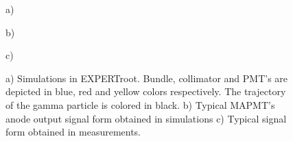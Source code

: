 \documentclass{webofc}
\newcommand{\er}{\textmd{EXPERTroot}}
\begin{document}
	\begin{figure} 
		\begin{minipage}[h]{\linewidth} 
			 a) \\ 
		\end{minipage} 
		\vfill 
		\begin{minipage}[h]{0.47\linewidth} 
			 b) \\
		\end{minipage} 
		\hfill 
		\begin{minipage}[h]{0.47\linewidth} 
			 c) \\ 
		\end{minipage} 
		\caption{a) Simulations in \er. Bundle, collimator and PMT's are depicted in blue, red and yellow colors respectively. The trajectory of the gamma particle is colored in black. b) Typical MAPMT's anode output signal form obtained in simulations c) Typical signal form obtained in measurements.} 
		\label{ris:sim} 
	\end{figure}
	
\end{document}
